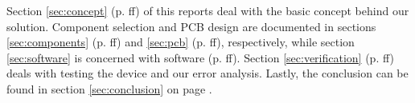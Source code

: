 Section  \ref{sec:concept}   (p.  \pageref{sec:concept}ff)  of   this  reports
deal  with   the  basic  concept  behind   our  solution. Component  selection
and   PCB  design   are  documented   in  sections   \ref{sec:components}  (p.
\pageref{sec:components}ff)   and   \ref{sec:pcb}  (p.   \pageref{sec:pcb}ff),
respectively,   while    section   \ref{sec:software}   is    concerned   with
software  (p. \pageref{sec:software}ff).   Section \ref{sec:verification}  (p.
\pageref{sec:verification}ff)  deals with  testing  the device  and our  error
analysis. Lastly, the conclusion can  be found in section \ref{sec:conclusion}
on page \pageref{sec:conclusion}.
